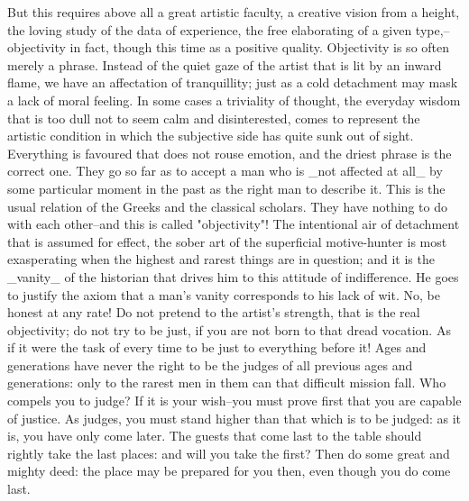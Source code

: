 But this requires above all a great artistic faculty, a creative
vision from a height, the loving study of the data of experience, the
free elaborating of a given type,--objectivity in fact, though this
time as a positive quality. Objectivity is so often merely a phrase.
Instead of the quiet gaze of the artist that is lit by an inward
flame, we have an affectation of tranquillity; just as a cold
detachment may mask a lack of moral feeling. In some cases a
triviality of thought, the everyday wisdom that is too dull not to
seem calm and disinterested, comes to represent the artistic
condition in which the subjective side has quite sunk out of sight.
Everything is favoured that does not rouse emotion, and the driest
phrase is the correct one. They go so far as to accept a man who is
_not affected at all_ by some particular moment in the past as the
right man to describe it. This is the usual relation of the Greeks
and the classical scholars. They have nothing to do with each
other--and this is called "objectivity"! The intentional air of
detachment that is assumed for effect, the sober art of the
superficial motive-hunter is most exasperating when the highest and
rarest things are in question; and it is the _vanity_ of the
historian that drives him to this attitude of indifference. He goes
to justify the axiom that a man's vanity corresponds to his lack of
wit. No, be honest at any rate! Do not pretend to the artist's
strength, that is the real objectivity; do not try to be just, if you
are not born to that dread vocation. As if it were the task of every
time to be just to everything before it! Ages and generations have
never the right to be the judges of all previous ages and
generations: only to the rarest men in them can that difficult
mission fall. Who compels you to judge? If it is your wish--you must
prove first that you are capable of justice. As judges, you must
stand higher than that which is to be judged: as it is, you have only
come later. The guests that come last to the table should rightly
take the last places: and will you take the first? Then do some great
and mighty deed: the place may be prepared for you then, even though
you do come last.

